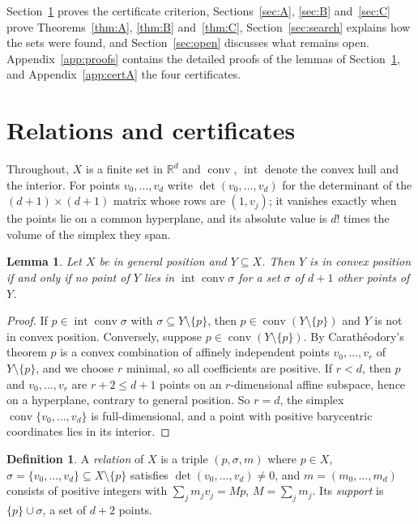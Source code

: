 \documentclass[aps,prd,twocolumn,superscriptaddress,nofootinbib,longbibliography,floatfix,showkeys,amsmath,amssymb,10pt]{revtex4-2}
\theoremstyle{plain}
\newtheorem{lemma}[theorem]{Lemma}
\theoremstyle{definition}
\newtheorem{definition}[theorem]{Definition}
\theoremstyle{plain}
\newcommand{\R}{\mathbb{R}}
\newcommand{\conv}{\operatorname{conv}}
\newcommand{\inter}{\operatorname{int}}
\begin{document}
Section~\ref{sec:cert} proves the certificate criterion, Sections~\ref{sec:A}, \ref{sec:B} and~\ref{sec:C} prove Theorems~\ref{thm:A}, \ref{thm:B} and~\ref{thm:C}, Section~\ref{sec:search} explains how the sets were found, and Section~\ref{sec:open} discusses what remains open. Appendix~\ref{app:proofs} contains the detailed proofs of the lemmas of Section~\ref{sec:cert}, and Appendix~\ref{app:certA} the four certificates.

\section{Relations and certificates}\label{sec:cert}

Throughout, $X$ is a finite set in $\R^d$ and $\conv$, $\inter$ denote the convex hull and the interior. For points $v_0,\dots,v_d$ write $\det(v_0,\dots,v_d)$ for the determinant of the $(d+1)\times(d+1)$ matrix whose rows are $(1,v_j)$; it vanishes exactly when the points lie on a common hyperplane, and its absolute value is $d!$ times the volume of the simplex they span.

\begin{lemma}\label{lem:caratheodory}
Let $X$ be in general position and $Y\subseteq X$. Then $Y$ is in convex position if and only if no point of $Y$ lies in $\inter\conv\sigma$ for a set $\sigma$ of $d+1$ other points of $Y$.
\end{lemma}

\begin{proof}
If $p\in\inter\conv\sigma$ with $\sigma\subseteq Y\setminus\{p\}$, then $p\in\conv(Y\setminus\{p\})$ and $Y$ is not in convex position. Conversely, suppose $p\in\conv(Y\setminus\{p\})$. By Carath\'eodory's theorem \cite{Gru03} $p$ is a convex combination of affinely independent points $v_0,\dots,v_r$ of $Y\setminus\{p\}$, and we choose $r$ minimal, so all coefficients are positive. If $r<d$, then $p$ and $v_0,\dots,v_r$ are $r+2\le d+1$ points on an $r$-dimensional affine subspace, hence on a hyperplane, contrary to general position. So $r=d$, the simplex $\conv\{v_0,\dots,v_d\}$ is full-dimensional, and a point with positive barycentric coordinates lies in its interior.
\end{proof}

\begin{definition}\label{def:relation}
A \emph{relation} of $X$ is a triple $(p,\sigma,m)$ where $p\in X$, $\sigma=\{v_0,\dots,v_d\}\subseteq X\setminus\{p\}$ satisfies $\det(v_0,\dots,v_d)\ne0$, and $m=(m_0,\dots,m_d)$ consists of positive integers with $\sum_jm_jv_j=Mp$, $M=\sum_jm_j$. Its \emph{support} is $\{p\}\cup\sigma$, a set of $d+2$ points.
\end{definition}
\end{document}
